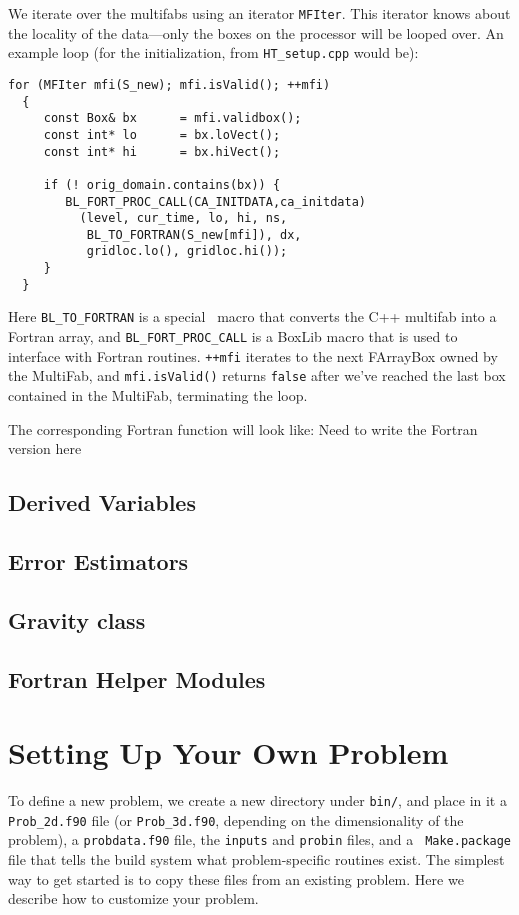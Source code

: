 We iterate over the multifabs using an iterator {\tt MFIter}.  This
iterator knows about the locality of the data---only the boxes on the
processor will be looped over.  An example loop (for the
initialization, from {\tt HT\_setup.cpp} would be):
\begin{lstlisting}
for (MFIter mfi(S_new); mfi.isValid(); ++mfi)
  {
     const Box& bx      = mfi.validbox();
     const int* lo      = bx.loVect();
     const int* hi      = bx.hiVect();

     if (! orig_domain.contains(bx)) {
        BL_FORT_PROC_CALL(CA_INITDATA,ca_initdata)
          (level, cur_time, lo, hi, ns,
           BL_TO_FORTRAN(S_new[mfi]), dx,
           gridloc.lo(), gridloc.hi());
     }
  }
\end{lstlisting}
Here {\tt BL\_TO\_FORTRAN} is a special \boxlib\ macro that converts the
C++ multifab into a Fortran array, and {\tt BL\_FORT\_PROC\_CALL}
is a BoxLib macro that is used to interface with Fortran routines. 
{\tt ++mfi} iterates to the next FArrayBox owned by the MultiFab, 
and {\tt mfi.isValid()} returns {\tt false} after we've reached 
the last box contained in the MultiFab, terminating the loop.

The corresponding Fortran function will look like:
{\color{red} Need to write the Fortran version here}


\subsection{Derived Variables}

\subsection{Error Estimators}


\subsection{Gravity class}


\subsection{Fortran Helper Modules}


\section{Setting Up Your Own Problem}

To define a new problem, we create a new directory under {\tt bin/},
and place in it a {\tt Prob\_2d.f90} file (or {\tt Prob\_3d.f90},
depending on the dimensionality of the problem), a {\tt probdata.f90}
file, the {\tt inputs} and {\tt probin} files, and a {\tt
  Make.package} file that tells the build system what problem-specific
routines exist.  The
simplest way to get started is to copy these files from an existing
problem.  Here we describe how to customize your problem.

